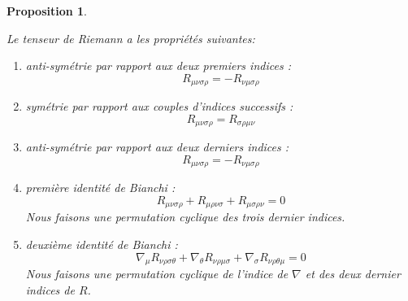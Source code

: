 \documentclass[a4paper,11pt]{report}
\theoremstyle{definition}
\theoremstyle{plain}
\newtheorem{prop}[thm]{Proposition}
\theoremstyle{definition}
\theoremstyle{remark}
\begin{document}
                \begin{prop}\begin{leftbar}
                    Le tenseur de Riemann a les propriétés suivantes:
                    \begin{enumerate}[label = \textit{\roman*)}]
                        \item anti-symétrie par rapport aux deux premiers indices :
                        \begin{equation}
                            R_{\mu\nu\sigma\rho} = -R_{\nu\mu\sigma\rho}
                        \end{equation}
                        \item symétrie par rapport aux couples d'indices successifs :
                        \begin{equation}
                            R_{\mu\nu\sigma\rho} = R_{\sigma\rho\mu\nu}
                        \end{equation}
                        \item anti-symétrie par rapport aux deux derniers indices :
                        \begin{equation}
                            R_{\mu\nu\sigma\rho} = -R_{\nu\mu\sigma\rho}
                        \end{equation}
                        \item \textit{première identité de Bianchi} :
                        \begin{equation}
                        R_{\mu\nu\sigma\rho}+R_{\mu\rho\nu\sigma}+R_{\mu\sigma\rho\nu} = 0
                        \end{equation}
                        Nous faisons une permutation cyclique des trois dernier indices.
                        \item \textit{deuxième identité de Bianchi} :
                        \begin{equation}
                            \nabla_\mu R_{\nu\rho\sigma\theta} + \nabla_\theta R_{\nu\rho\mu\sigma}+\nabla_\sigma R_{\nu\rho\theta\mu} = 0
                        \end{equation}
                        Nous faisons une permutation cyclique de l'indice de $\nabla$ et des deux dernier indices de $R$.
                    \end{enumerate}
                \end{leftbar}\end{prop}
                
\end{document}
